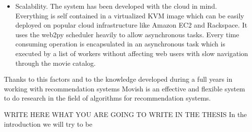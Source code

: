 \begin{itemize}
\item Scalability. The system has been developed with the cloud in mind. Everything is self contained in a virtualized KVM image which can be easily deployed on popular cloud infrastructure like Amazon EC2 and Rackspace. It uses the web2py scheduler heavily to allow asynchronous tasks. Every time consuming operation is encapsulated in an asynchronous task which is executed by a list of workers without affecting web users with slow navigation through the movie catalog. 
\end{itemize}

Thanks to this factors and to the knowledge developed during a full years in working with recommendation systems Movish is an effective and flexible system to do research in the field of algorithms for recommendation systems.

WRITE HERE WHAT YOU ARE GOING TO WRITE IN THE THESIS
In the introduction we will try to be  